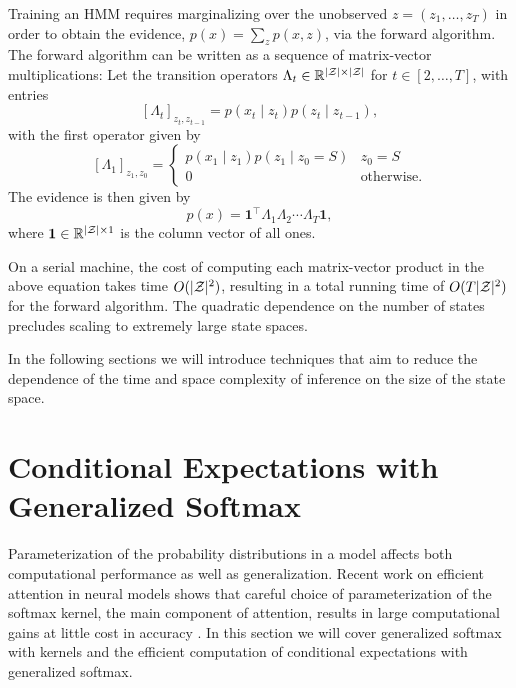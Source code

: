 \documentclass{article}
\begin{document}
Training an HMM requires marginalizing over the unobserved
$z = (z_1,\ldots,z_T)$ in order to obtain the evidence, $p(x) = \sum_z p(x,z)$,
via the forward algorithm.
The forward algorithm can be written as a sequence of matrix-vector multiplications:
Let the transition operators $\Lambda_t\in\mathbb{R}^{|\mathcal{Z}|\times|\mathcal{Z}|}$ for $t\in[2,\ldots,T]$, 
with entries $$[\Lambda_t]_{z_t,z_{t-1}} = p(x_t\mid z_t)p(z_t\mid z_{t-1}),$$
with the first operator given by
$$[\Lambda_1]_{z_1,z_0} = \begin{cases}
p(x_1 \mid z_1) p(z_1 \mid z_0=S) & z_0 = S\\
0 & \textrm{otherwise}.
\end{cases}
$$
The evidence is then given by
\begin{equation}
p(x) = \mathbf{1}^\top\Lambda_1\Lambda_2\cdots\Lambda_T\mathbf{1},
\end{equation}
where $\mathbf{1}\in\mathbb{R}^{|\mathcal{Z}|\times1}$ is the column vector of all ones.

On a serial machine, the cost of computing each matrix-vector product in
the above equation takes time $O(|\mathcal{Z}|^2)$, resulting in a total
running time of $O(T|\mathcal{Z}|^2)$ for the forward algorithm.
The quadratic dependence on the number of states precludes
scaling to extremely large state spaces.

In the following sections we will introduce techniques that
aim to reduce the dependence of the time and space complexity
of inference on the size of the state space.

\section{Conditional Expectations with Generalized Softmax}
Parameterization of the probability distributions in a model affects both
computational performance as well as generalization.
Recent work on efficient attention in neural models shows that careful choice of parameterization
of the softmax kernel, the main component of attention,
results in large computational gains at little cost in accuracy
\citep{choromanski2020performer,peng2021rfa}.
In this section we will cover generalized softmax with kernels and the
efficient computation of conditional expectations with generalized softmax.
\end{document}
